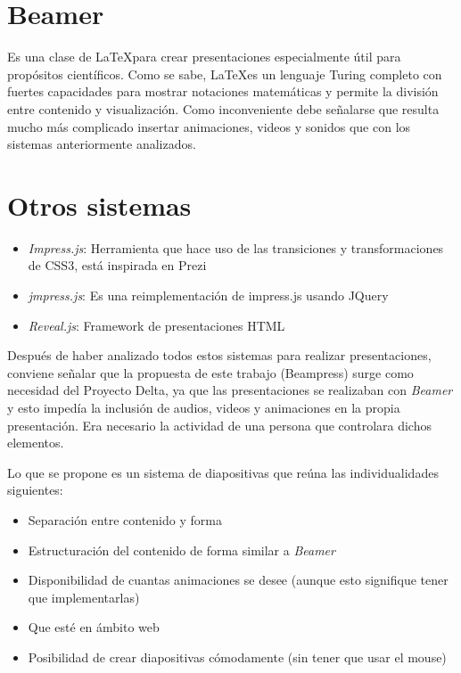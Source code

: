 	\section*{Beamer} %
	\label{sec:beamer}

		Es una clase de \LaTeX para crear presentaciones especialmente útil para propósitos científicos. Como se sabe, \LaTeX es un lenguaje Turing completo con fuertes capacidades para mostrar notaciones matemáticas y permite la división entre contenido y visualización. Como inconveniente debe señalarse que resulta mucho más complicado insertar animaciones, videos y sonidos que con los sistemas anteriormente analizados.	


	\section*{Otros sistemas} %
	\label{sec:otros_sistemas}
		\begin{itemize}
			\item \textit{Impress.js}: Herramienta que hace uso de las transiciones y transformaciones de CSS3, está inspirada en Prezi
			\item \textit{jmpress.js}: Es una reimplementación de impress.js usando JQuery
			\item \textit{Reveal.js}: Framework de presentaciones HTML
		\end{itemize}

	Después de haber analizado todos estos sistemas para realizar presentaciones, conviene señalar que la propuesta de este trabajo (Beampress) surge como necesidad del Proyecto Delta, ya que las presentaciones se realizaban con \textit{Beamer} y esto impedía la inclusión de audios, videos y animaciones en la propia presentación. Era necesario la actividad de una persona que controlara dichos elementos. 

	Lo que se propone es un sistema de diapositivas que reúna las individualidades siguientes:

	\begin{itemize}
			\item Separación entre contenido y forma
			\item Estructuración del contenido de forma similar a \textit{Beamer}
			\item Disponibilidad de cuantas animaciones se desee (aunque esto signifique tener que implementarlas)
			\item Que esté en ámbito web
			\item Posibilidad de crear diapositivas cómodamente (sin tener que usar el mouse)
	\end{itemize}

